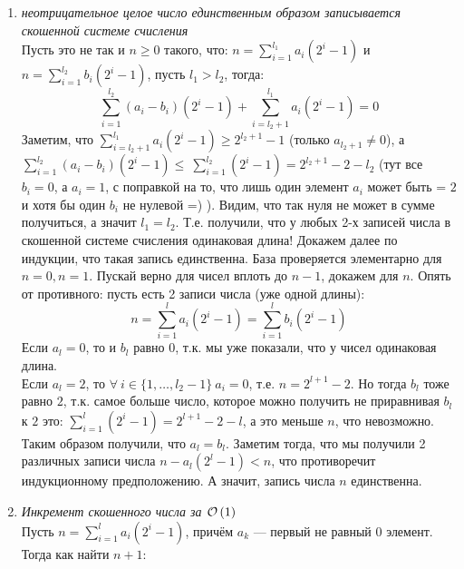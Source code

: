 \begin{enumerate}[label={\textbf{(\alph*)}}]
\item \textit{неотрицательное целое число единственным образом записывается скошенной системе счисления}\\
Пусть это не так и $n \geq 0$ такого, что: $n = \sum_{i=1}^{l_1}{a_i(2^i-1)}$ и $n = \sum_{i=1}^{l_2}{b_i(2^i-1)}$, пусть $l_1>l_2$, тогда:
\[\sum_{i=1}^{l_2}{(a_i-b_i)(2^i-1)} + \sum_{i=l_2+1}^{l_1}{a_i(2^i-1)}=0 \]
Заметим, что $\sum_{i=l_2+1}^{l_1}{a_i(2^i-1)}\geq 2^{l_2+1}-1$ (только $a_{l_2+1} \neq 0$), а $\sum_{i=1}^{l_2}{(a_i-b_i)(2^i-1)} \leq \ \sum_{i=1}^{l_2}{(2^i-1)}=2^{l_2+1}-2-l_2$ (тут все $b_i=0$, а $a_i=1$, с поправкой на то, что лишь один элемент $a_i$ может быть = $2$ и хотя бы один $b_i$ не нулевой =) ).
Видим, что так нуля не может в сумме получиться, а значит $l_1=l_2$. Т.е. получили, что у любых 2-х
записей числа в скошенной системе счисления одинаковая длина! Докажем далее по индукции, что
такая запись единственна. База проверяется элементарно для $n=0,n=1$. Пускай верно для чисел вплоть до
$n-1$, докажем для $n$. Опять от противного: пусть есть 2 записи числа (уже одной длины):
\[ n = \sum_{i=1}^{l}{a_i(2^i-1)} = \sum_{i=1}^{l}{b_i(2^i-1)} \]
Если $a_{l}=0$, то и $b_{l}$ равно $0$, т.к. мы уже показали, что у чисел одинаковая длина.\\
Если $a_{l}=2$, то $\forall\ i\in \lbrace 1,\ldots,l_2-1\rbrace\ a_i = 0$, т.е. $n=2^{l+1}-2$. Но тогда
$b_{l}$ тоже равно $2$, т.к. самое больше число, которое можно получить не приравнивая $b_{l}$ к $2$ это:
$\sum_{i=1}^{l}{(2^i-1)}=2^{l+1}-2-l$, а это меньше $n$, что невозможно. Таким образом получили, что
$a_{l}=b_{l}$. Заметим тогда, что мы получили 2 различных записи числа $n-a_l(2^{l}-1) < n$, что противоречит
индукционному предположению. А значит, запись числа $n$ единственна. \xqed

\item \textit{Инкремент скошенного числа за $\mathcal{O}\left(1\right)$}\\
Пусть $n=\sum_{i=1}^{l}{a_i(2^i-1)}$, причём $a_k$ --- первый не равный $0$ элемент. Тогда как
найти $n+1$:

\begin{enumerate}


\end{enumerate}
\end{enumerate}
